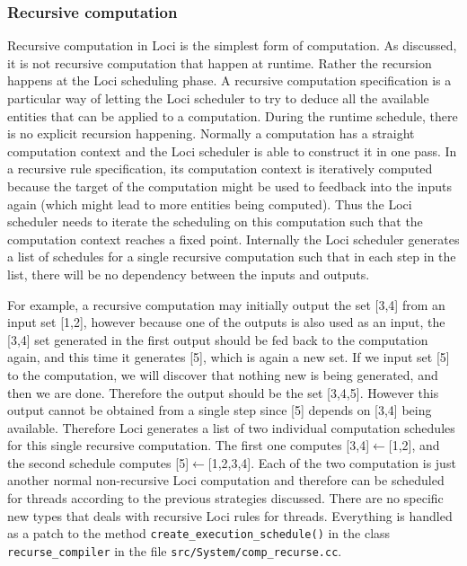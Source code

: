 \documentclass{article}
\begin{document}
\subsubsection{Recursive computation}
Recursive computation in Loci is the simplest form of computation.  As
discussed, it is not recursive computation that happen at runtime.
Rather the recursion happens at the Loci scheduling phase.  A recursive
computation specification is a particular way of letting the Loci
scheduler to try to deduce all the available entities that can be
applied to a computation.  During the runtime schedule, there is no
explicit recursion happening.  Normally a computation has a straight
computation context and the Loci scheduler is able to construct it in
one pass.  In a recursive rule specification, its computation context is
iteratively computed because the target of the computation might be used
to feedback into the inputs again (which might lead to more entities
being computed).  Thus the Loci scheduler needs to iterate the
scheduling on this computation such that the computation context reaches
a fixed point.  Internally the Loci scheduler generates a list of
schedules for a single recursive computation such that in each step in
the list, there will be no dependency between the inputs and outputs.

For example, a recursive computation may initially output the set [3,4]
from an input set [1,2], however because one of the outputs is also used
as an input, the [3,4] set generated in the first output should be
fed back to the computation again, and this time it generates [5], which
is again a new set.  If we input set [5] to the computation, we will
discover that nothing new is being generated, and then we are done.
Therefore the output should be the set [3,4,5].  However this output
cannot be obtained from a single step since [5] depends on [3,4] being
available.  Therefore Loci generates a list of two individual
computation schedules for this single recursive computation.  The first
one computes [3,4]$\gets$[1,2], and the second schedule computes
[5]$\gets$[1,2,3,4].  Each of the two computation is just another normal
non-recursive Loci computation and therefore can be scheduled for
threads according to the previous strategies discussed.  There are no
specific new types that deals with recursive Loci rules for threads.
Everything is handled as a patch to the method
\lstinline{create_execution_schedule()} in the class
\lstinline{recurse_compiler} in the file
\lstinline{src/System/comp_recurse.cc}.
\end{document}
